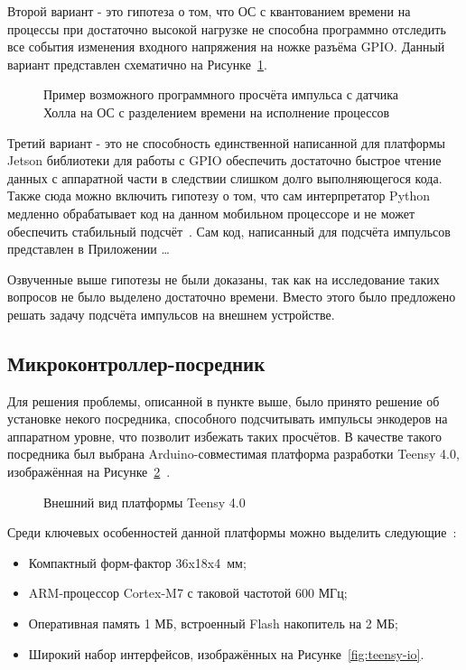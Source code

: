 Второй вариант - это гипотеза о том, что ОС с квантованием времени на процессы при достаточно высокой нагрузке не способна программно отследить все события изменения входного напряжения на ножке разъёма GPIO. Данный вариант представлен схематично на Рисунке~\cref{fig:miscount}.

\begin{figure}[ht]
    \caption{Пример возможного программного просчёта импульса с датчика Холла на ОС с разделением времени на исполнение процессов}\label{fig:miscount}
\end{figure}

Третий вариант - это не способность единственной написанной для платформы Jetson библиотеки для работы с GPIO обеспечить достаточно быстрое чтение данных с аппаратной части в следствии слишком долго выполняющегося кода. Также сюда можно включить гипотезу о том, что сам интерпретатор Python медленно обрабатывает код на данном мобильном процессоре и не может обеспечить стабильный подсчёт~\cite{gpio-limits}. Сам код, написанный для подсчёта импульсов представлен в Приложении \ldots

Озвученные выше гипотезы не были доказаны, так как на исследование таких вопросов не было выделено достаточно времени. Вместо этого было предложено решать задачу подсчёта импульсов на внешнем устройстве.

\subsection{Микроконтроллер-посредник}
Для решения проблемы, описанной в пункте выше, было принято решение об установке некого посредника, способного подсчитывать импульсы энкодеров на аппаратном уровне, что позволит избежать таких просчётов. В качестве такого посредника был выбрана Arduino-совместимая платформа разработки Teensy 4.0, изображённая на Рисунке~\cref{fig:teensy}~\cite{teensy}.

\begin{figure}[ht]
    \caption{Внешний вид платформы Teensy 4.0}\label{fig:teensy}
\end{figure}

Среди ключевых особенностей данной платформы можно выделить следующие~\cite{teensy}:
\begin{itemize}[beginpenalty=10000] %
  \item Компактный форм-фактор 36x18x4~мм;
  \item ARM-процессор Cortex-M7 с таковой частотой 600 МГц;
  \item Оперативная память 1 МБ, встроенный Flash накопитель на 2 МБ;
  \item Широкий набор интерфейсов, изображённых на Рисунке~\cref{fig:teensy-io}.
\end{itemize}

